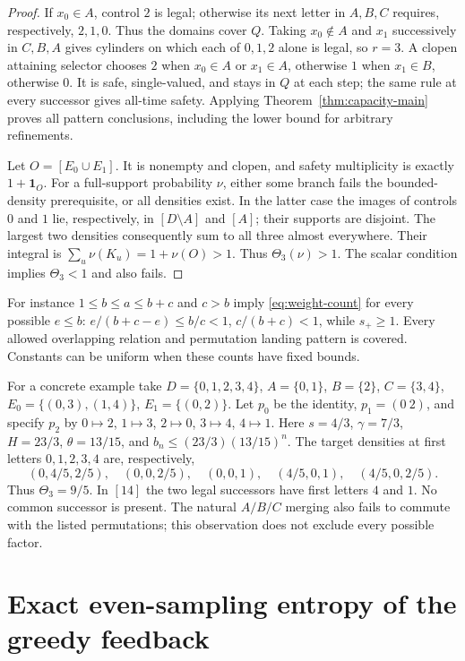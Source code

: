 \documentclass[11pt,reqno]{amsart}
\numberwithin{equation}{section}
\theoremstyle{definition}
\theoremstyle{definition}
\newcommand{\one}{\mathbf 1}
\begin{document}
\begin{proof}
If $x_0\in A$, control $2$ is legal; otherwise its next letter
in $A,B,C$ requires, respectively, $2,1,0$. Thus the domains
cover $Q$. Taking $x_0\notin A$ and $x_1$ successively in
$C,B,A$ gives cylinders on which each of $0,1,2$ alone is legal,
so $r=3$. A clopen attaining selector chooses $2$ when $x_0\in A$
or $x_1\in A$, otherwise $1$ when $x_1\in B$, otherwise $0$.
It is safe, single-valued, and stays in $Q$ at each step; the same
rule at every successor gives all-time safety. Applying
Theorem~\ref{thm:capacity-main} proves all pattern conclusions,
including the lower bound for arbitrary refinements.

Let $O=[E_0\cup E_1]$. It is nonempty and clopen, and safety
multiplicity is exactly $1+\one_O$. For a full-support probability
$\nu$, either some branch fails the bounded-density prerequisite,
or all densities exist. In the latter case the images of controls
$0$ and $1$ lie, respectively, in $[D\setminus A]$ and $[A]$;
their supports are disjoint. The largest two densities consequently
sum to all three almost everywhere. Their integral is
$\sum_u\nu(K_u)=1+\nu(O)>1$. Thus $\Theta_3(\nu)>1$.
The scalar condition implies $\Theta_3<1$ and also fails.
\end{proof}

For instance
$1\le b\le a\le b+c$ and $c>b$ imply
\eqref{eq:weight-count} for every possible $e\le b$:
$e/(b+c-e)\le b/c<1$, $c/(b+c)<1$, while $s_+\ge1$.
Every allowed overlapping relation and permutation landing pattern
is covered. Constants can be uniform when these counts have fixed
bounds.

For a concrete example take
$D=\{0,1,2,3,4\}$, $A=\{0,1\}$, $B=\{2\}$,
$C=\{3,4\}$, $E_0=\{(0,3),(1,4)\}$,
$E_1=\{(0,2)\}$. Let $p_0$ be the identity,
$p_1=(0\ 2)$, and specify $p_2$ by
$0\mapsto2$, $1\mapsto3$, $2\mapsto0$, $3\mapsto4$,
$4\mapsto1$. Here $s=4/3$, $\gamma=7/3$, $H=23/3$,
$\theta=13/15$, and
$b_n\le(23/3)(13/15)^n$. The target densities at first letters
$0,1,2,3,4$ are, respectively,
\[
 (0,4/5,2/5),\quad(0,0,2/5),\quad(0,0,1),\quad
 (4/5,0,1),\quad(4/5,0,2/5).
\]
Thus $\Theta_3=9/5$. In $[14]$ the two legal successors have
first letters $4$ and $1$. No common successor is present. The
natural $A/B/C$ merging also fails to commute with the listed
permutations; this observation does not exclude every possible factor.

\section{Exact even-sampling entropy of the greedy feedback}
\label{app:greedy}
\end{document}
